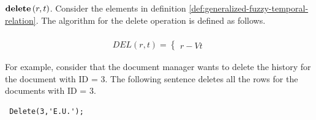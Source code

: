\begin{definition}
 \emph{$\mbox{\textbf{delete}} \left(r, t \right) $}.
Consider the elements in definition \ref{def:generalized-fuzzy-temporal-relation}. The algorithm for the delete operation is defined as follows.
\end{definition}


\begin{align}
\label{eq:delete-fuzzy-temporal}
\\DEL \left(r, t\right) =
\begin{cases}
\nonumber
r - Vt
\end{cases} 	
\end{align}

For example, consider that the document manager wants to delete the history for the document with ID = 3. The following sentence deletes all the rows for the documents with ID = 3.

\begin{verbatim}
 Delete(3,'E.U.');
\end{verbatim}


% 
% 
% 
